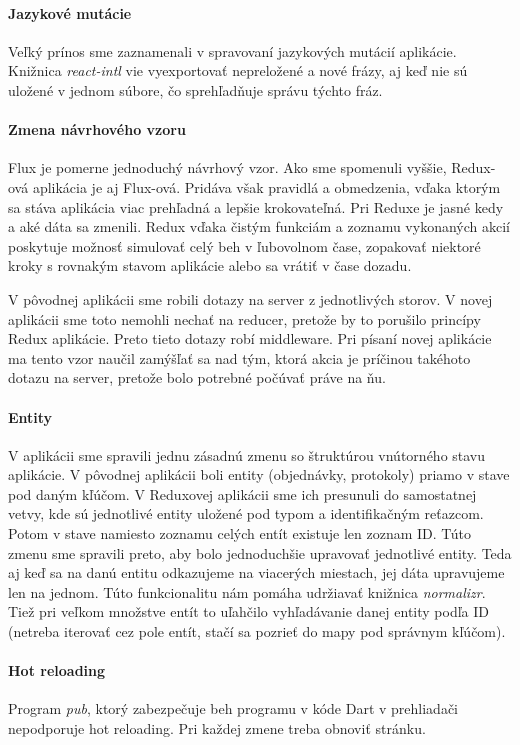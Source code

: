 \paragraph{Jazykové mutácie}
Veľký prínos sme zaznamenali v spravovaní jazykových mutácií aplikácie. Knižnica \emph{react-intl} vie vyexportovať nepreložené a nové frázy, aj keď nie sú uložené v jednom súbore, čo sprehľadňuje správu týchto fráz.

\paragraph{Zmena návrhového vzoru}
Flux je pomerne jednoduchý návrhový vzor. Ako sme spomenuli vyššie, Redux-ová aplikácia je aj Flux-ová. Pridáva však pravidlá a obmedzenia, vďaka ktorým sa stáva aplikácia viac prehľadná a lepšie krokovateľná. Pri Reduxe je jasné kedy a aké dáta sa zmenili. Redux vďaka čistým funkciám a zoznamu vykonaných akcií poskytuje možnosť simulovať celý beh v ľubovolnom čase, zopakovať niektoré kroky s rovnakým stavom aplikácie alebo sa vrátiť v čase dozadu.

V pôvodnej aplikácii sme robili dotazy na server z jednotlivých storov. V novej aplikácii sme toto nemohli nechať na reducer, pretože by to porušilo princípy Redux aplikácie. Preto tieto dotazy robí middleware. Pri písaní novej aplikácie ma tento vzor naučil zamýšľať sa nad tým, ktorá akcia je príčinou takéhoto dotazu na server, pretože bolo potrebné počúvať práve na ňu.

\paragraph{Entity}
V aplikácii sme spravili jednu zásadnú zmenu so štruktúrou vnútorného stavu aplikácie. V pôvodnej aplikácii boli entity (objednávky, protokoly) priamo v stave pod daným kľúčom. 
V Reduxovej aplikácii sme ich presunuli do samostatnej vetvy, kde sú jednotlivé entity uložené pod typom a identifikačným reťazcom. Potom v stave namiesto zoznamu celých entít existuje len zoznam ID. 
Túto zmenu sme spravili preto, aby bolo jednoduchšie upravovať jednotlivé entity. Teda aj keď sa na danú entitu odkazujeme na viacerých miestach, jej dáta upravujeme len na jednom. Túto funkcionalitu nám pomáha udržiavať knižnica \emph{normalizr}.
Tiež pri veľkom množstve entít to uľahčilo vyhľadávanie danej entity podľa ID (netreba iterovať cez pole entít, stačí sa pozrieť do mapy pod správnym kľúčom).

\paragraph{Hot reloading}
Program \emph{pub}, ktorý zabezpečuje beh programu v kóde Dart v prehliadači nepodporuje hot reloading. Pri každej zmene treba obnoviť stránku.

